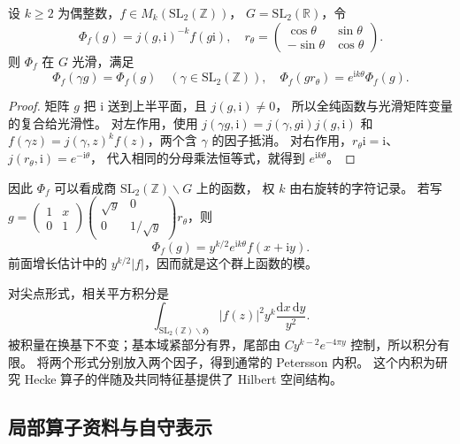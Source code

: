 \begin{proposition}[权的群上表达]\label{b3:prop:E-group-lift}
设 \(k\ge2\) 为偶整数，\(f\in M_k(\mathrm{SL}_2(\mathbb Z))\)，
\(G=\mathrm{SL}_2(\mathbb R)\)，令
\[
 \Phi_f(g)=j(g,\mathrm i)^{-k}f(g\mathrm i),
 \quad
 r_\theta=\begin{pmatrix}\cos\theta&\sin\theta\\-\sin\theta&\cos\theta\end{pmatrix}.
\]
则 \(\Phi_f\) 在 \(G\) 光滑，满足
\[
 \Phi_f(\gamma g)=\Phi_f(g)\quad(\gamma\in\mathrm{SL}_2(\mathbb Z)),
 \quad \Phi_f(gr_\theta)=e^{\mathrm i k\theta}\Phi_f(g).
\]
\end{proposition}
\begin{proof}
矩阵 \(g\) 把 \(\mathrm i\) 送到上半平面，且 \(j(g,\mathrm i)\ne0\)，
所以全纯函数与光滑矩阵变量的复合给光滑性。
对左作用，使用 \(j(\gamma g,\mathrm i)=j(\gamma,g\mathrm i)j(g,\mathrm i)\)
和 \(f(\gamma z)=j(\gamma,z)^kf(z)\)，两个含 \(\gamma\) 的因子抵消。
对右作用，\(r_\theta\mathrm i=\mathrm i\)、\(j(r_\theta,\mathrm i)=e^{-\mathrm i\theta}\)，
代入相同的分母乘法恒等式，就得到 \(e^{\mathrm i k\theta}\)。
\end{proof}
因此 \(\Phi_f\) 可以看成商 \(\mathrm{SL}_2(\mathbb Z)\backslash G\) 上的函数，
权 \(k\) 由右旋转的字符记录。
若写
\(g=\left(\begin{smallmatrix}1&x\\0&1\end{smallmatrix}\right)
\left(\begin{smallmatrix}\sqrt y&0\\0&1/\sqrt y\end{smallmatrix}\right)r_\theta\)，则
\[
 \Phi_f(g)=y^{k/2}e^{\mathrm i k\theta}f(x+\mathrm i y).
\]
前面增长估计中的 \(y^{k/2}|f|\)，因而就是这个群上函数的模。

\ProseParagraphBreak

对尖点形式，相关平方积分是
\[
 \int_{\mathrm{SL}_2(\mathbb Z)\backslash\mathfrak H}
       |f(z)|^2y^k\frac{\mathrm dx\,\mathrm dy}{y^2}.
\]
被积量在换基下不变；基本域紧部分有界，尾部由
\(C y^{k-2}e^{-4\pi y}\) 控制，所以积分有限。
将两个形式分别放入两个因子，得到通常的 Petersson 内积。
这个内积为研究 Hecke 算子的伴随及共同特征基提供了 Hilbert 空间结构。

\subsection{局部算子资料与自守表示}
\label{b3:subsec:E0502}

